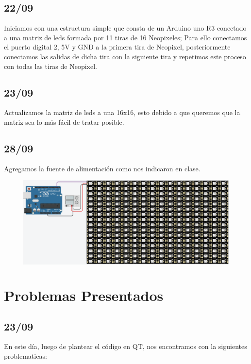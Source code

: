 \documentclass{article}
\begin{document}
    \begin{flushleft}
        \subsection{22/09}
        Iniciamos con una estructura simple que consta de un Arduino uno R3 conectado a una matriz de leds formada por 11 tiras de 16 Neopixeles; Para ello conectamos el puerto digital 2, 5V y GND a la primera tira de Neopixel, posteriormente conectamos las salidas de dicha tira con la siguiente tira y repetimos este proceso con todas las tiras de Neopixel.
    \end{flushleft}
    
    \begin{flushleft}
        \subsection{23/09}
        Actualizamos la matriz de leds a una 16x16, esto debido a que queremos que la matriz sea lo más fácil de tratar posible.
    \end{flushleft}
    
    \begin{flushleft}
        \subsection{28/09}
        Agregamos la fuente de alimentación como nos indicaron en clase.
    \end{flushleft}
    
    \begin{figure}[h]
    \includegraphics[width=13cm]{Images/leds.png}
    \centering
    \label{fig:leds}
    \end{figure}
    \vspace{0.5cm}
    
\newpage
    
\section{Problemas Presentados}
\label{problemas}
    \begin{flushleft}
     \subsection{23/09}
     En este día, luego de plantear el código en QT, nos encontramos con la siguientes problematicas:
    \end{flushleft}
    
\end{document}
